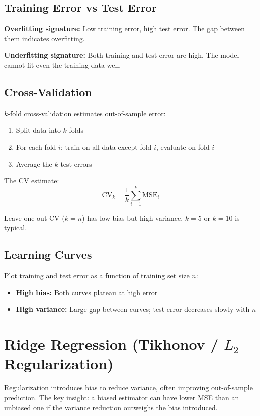 \documentclass[main.tex]{subfiles}
\begin{document}
\subsection{Training Error vs Test Error}

\textbf{Overfitting signature:} Low training error, high test error. The gap between them indicates overfitting.

\textbf{Underfitting signature:} Both training and test error are high. The model cannot fit even the training data well.

\subsection{Cross-Validation}

$k$-fold cross-validation estimates out-of-sample error:
\begin{enumerate}
    \item Split data into $k$ folds
    \item For each fold $i$: train on all data except fold $i$, evaluate on fold $i$
    \item Average the $k$ test errors
\end{enumerate}

The CV estimate:
$$\text{CV}_k = \frac{1}{k}\sum_{i=1}^{k} \text{MSE}_i$$

Leave-one-out CV ($k = n$) has low bias but high variance. $k = 5$ or $k = 10$ is typical.

\subsection{Learning Curves}

Plot training and test error as a function of training set size $n$:
\begin{itemize}
    \item \textbf{High bias:} Both curves plateau at high error
    \item \textbf{High variance:} Large gap between curves; test error decreases slowly with $n$
\end{itemize}

\needspace{0.33\textheight}
\section{Ridge Regression (Tikhonov / $L_2$ Regularization)}

Regularization introduces bias to reduce variance, often improving out-of-sample prediction. The key insight: a biased estimator can have lower MSE than an unbiased one if the variance reduction outweighs the bias introduced.
\end{document}
